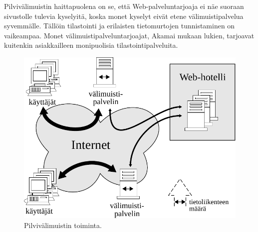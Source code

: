 Pilvivälimuistin haittapuolena on se, että Web-palveluntarjoaja ei näe
suoraan sivustolle tulevia kyselyitä, koska monet kyselyt eivät etene
välimuistipalvelua syvemmälle. Tällöin tilastointi ja erilaisten tietomurtojen
tunnistaminen on vaikeampaa. Monet välimuistipalveluntarjoajat, Akamai
mukaan lukien, tarjoavat kuitenkin asiakkailleen monipuolisia tilastointipalveluita.

\begin{figure}[htp]
\centering
\includegraphics[width=12cm]{pics/cloudcache.pdf}
\caption{Pilvivälimuistin toiminta.}
\label{cloudcache}
\end{figure}
